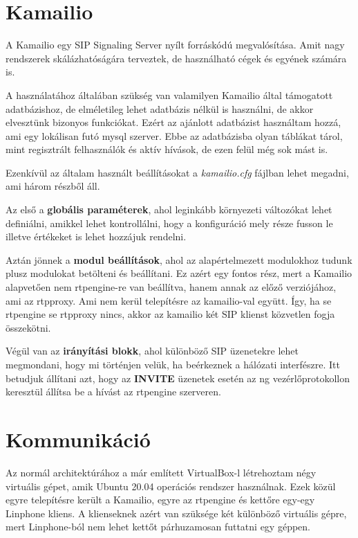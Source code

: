 \section{Kamailio}

A Kamailio egy SIP Signaling Server nyílt forráskódú megvalósítása. Amit nagy rendszerek
skálázhatóságára terveztek, de használható cégek és egyének számára is.

A használatához általában szükség van valamilyen Kamailio által támogatott adatbázishoz,
de elméletileg lehet adatbázis nélkül is használni, de akkor elvesztünk bizonyos funkciókat. 
Ezért az ajánlott adatbázist használtam hozzá, ami egy lokálisan futó mysql szerver. Ebbe 
az adatbázisba olyan táblákat tárol, mint regisztrált felhasználók és aktív hívások, de 
ezen felül még sok mást is. 

Ezenkívül az általam használt beállításokat a \textit{kamailio.cfg} fájlban lehet megadni,
ami három részből áll. 

Az első a \textbf{globális paraméterek}, ahol leginkább környezeti változókat lehet 
definiálni, amikkel lehet kontrollálni, hogy a konfiguráció mely része fusson le illetve
értékeket is lehet hozzájuk rendelni. 

Aztán jönnek a \textbf{modul beállítások}, ahol az alapértelmezett modulokhoz tudunk plusz
modulokat betölteni és beállítani. Ez azért egy fontos rész, mert a Kamailio alapvetően 
nem rtpengine-re van beállítva, hanem annak az előző verziójához, ami az rtpproxy. Ami 
nem kerül telepítésre az kamailio-val együtt. Így, ha se rtpengine se rtpproxy nincs,
akkor az kamailio két SIP klienst közvetlen fogja összekötni.

Végül van az \textbf{irányítási blokk}, ahol különböző SIP üzenetekre lehet megmondani, hogy mi
történjen velük, ha beérkeznek a hálózati interfészre. Itt betudjuk állítani azt, hogy
az \textbf{INVITE} üzenetek esetén az ng vezérlőprotokollon keresztül állítsa be a hívást
az rtpengine szerveren.

\section{Kommunikáció}

Az normál architektúrához a már említett VirtualBox-l létrehoztam négy virtuális gépet,
amik Ubuntu 20.04 operációs rendszer használnak. Ezek közül egyre telepítésre került 
a Kamailio, egyre az rtpengine és kettőre egy-egy Linphone kliens. A klienseknek azért
van szüksége két különböző virtuális gépre, mert Linphone-ból nem lehet kettőt
párhuzamosan futtatni egy géppen.

